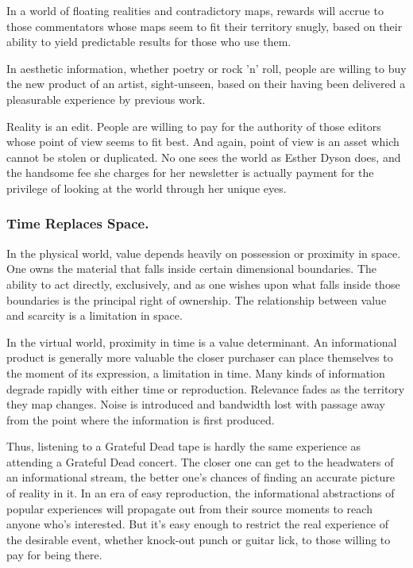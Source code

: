 \documentclass[
]{article}
\begin{document}
In a world of floating realities and contradictory maps, rewards will
accrue to those commentators whose maps seem to fit their territory
snugly, based on their ability to yield predictable results for those
who use them.

In aesthetic information, whether poetry or rock 'n' roll, people are
willing to buy the new product of an artist, sight-unseen, based on
their having been delivered a pleasurable experience by previous work.

Reality is an edit. People are willing to pay for the authority of those
editors whose point of view seems to fit best. And again, point of view
is an asset which cannot be stolen or duplicated. No one sees the world
as Esther Dyson does, and the handsome fee she charges for her
newsletter is actually payment for the privilege of looking at the world
through her unique eyes.

\hypertarget{header-n306}{%
\subsubsection{Time Replaces Space.}\label{header-n306}}

In the physical world, value depends heavily on possession or proximity
in space. One owns the material that falls inside certain dimensional
boundaries. The ability to act directly, exclusively, and as one wishes
upon what falls inside those boundaries is the principal right of
ownership. The relationship between value and scarcity is a limitation
in space.

In the virtual world, proximity in time is a value determinant. An
informational product is generally more valuable the closer purchaser
can place themselves to the moment of its expression, a limitation in
time. Many kinds of information degrade rapidly with either time or
reproduction. Relevance fades as the territory they map changes. Noise
is introduced and bandwidth lost with passage away from the point where
the information is first produced.

Thus, listening to a Grateful Dead tape is hardly the same experience as
attending a Grateful Dead concert. The closer one can get to the
headwaters of an informational stream, the better one's chances of
finding an accurate picture of reality in it. In an era of easy
reproduction, the informational abstractions of popular experiences will
propagate out from their source moments to reach anyone who's
interested. But it's easy enough to restrict the real experience of the
desirable event, whether knock-out punch or guitar lick, to those
willing to pay for being there.
\end{document}
